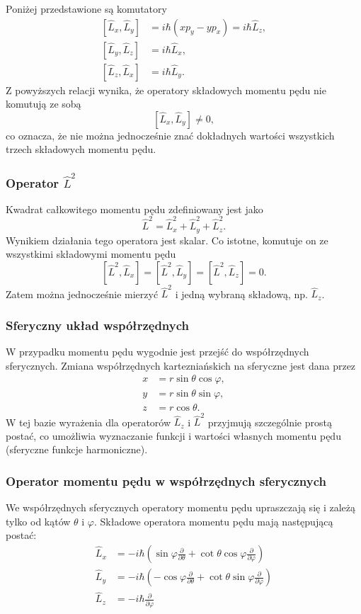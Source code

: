 Poniżej przedstawione są komutatory
$$
\begin{aligned}
  [\hat{L}_x, \hat{L}_y] &= i\hbar(xp_y - yp_x) = i \hbar \hat{L}_z, \\
  [\hat{L}_y, \hat{L}_z] &= i \hbar \hat{L}_x, \\
  [\hat{L}_z, \hat{L}_x] &= i \hbar \hat{L}_y.
\end{aligned}
$$
Z powyższych relacji wynika, że operatory składowych momentu pędu nie komutują ze sobą
$$
[\hat{L}_x, \hat{L}_y] \neq 0,
$$
co oznacza, że nie można jednocześnie znać dokładnych wartości wszystkich trzech składowych momentu pędu.

\subsubsection*{Operator $\hat{L}^2$}
Kwadrat całkowitego momentu pędu zdefiniowany jest jako
$$
\hat{L}^2 = \hat{L}_x^2 + \hat{L}_y^2 + \hat{L}_z^2.
$$
Wynikiem działania tego operatora jest skalar.
Co istotne, komutuje on ze wszystkimi składowymi momentu pędu
$$
[\hat{L}^2, \hat{L}_x] = [\hat{L}^2, \hat{L}_y] = [\hat{L}^2, \hat{L}_z] = 0.
$$
Zatem można jednocześnie mierzyć $\hat{L}^2$ i jedną wybraną składową, np. $\hat{L}_z$.

\subsubsection*{Sferyczny układ współrzędnych}
W przypadku momentu pędu wygodnie jest przejść do współrzędnych sferycznych.
Zmiana współrzędnych kartezniańskich na sferyczne jest dana przez
$$
\begin{aligned}
x &= r \sin \theta \cos \varphi, \\
y &= r \sin \theta \sin \varphi, \\
z &= r \cos \theta.
\end{aligned}
$$
W tej bazie wyrażenia dla operatorów $\hat{L}_z$ i $\hat{L}^2$
przyjmują szczególnie prostą postać,
co umożliwia wyznaczanie funkcji i wartości własnych momentu pędu
(sferyczne funkcje harmoniczne).


\subsubsection*{Operator momentu pędu w współrzędnych sferycznych}
We współrzędnych sferycznych operatory momentu pędu upraszczają się
i zależą tylko od kątów $\theta$ i $\varphi$.
Składowe operatora momentu pędu mają następującą postać:
$$
\begin{aligned}
\hat{L}_x &= -i\hbar \left( \sin\varphi \frac{\partial}{\partial\theta} + \cot\theta \cos\varphi \frac{\partial}{\partial\varphi} \right) \\
\hat{L}_y &= -i\hbar \left( -\cos\varphi \frac{\partial}{\partial\theta} + \cot\theta \sin\varphi \frac{\partial}{\partial\varphi} \right) \\
\hat{L}_z &= -i\hbar \frac{\partial}{\partial\varphi}
\end{aligned}
$$

